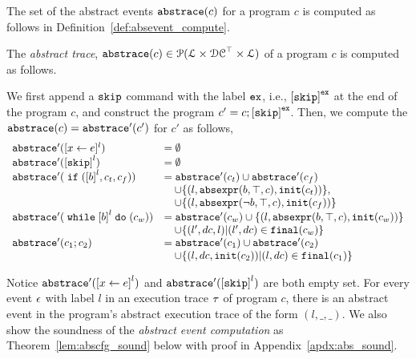 The set of the abstract events $\mathtt{abs}{\mathtt{trace}}(c)$ for a program $c$
is computed as follows in Definition~\ref{def:absevent_compute}.
 \begin{defn}
 \label{def:psRB-absevent_compute}
 The \emph{abstract trace}, $\mathtt{abs}{\mathtt{trace}}(c) \in \mathcal{P}( \mathcal{L} \times \mathcal{DC}^{\top} \times \mathcal{L} )$ of a program $c$ is computed as follows.

 We first append a $\mathtt{skip}$ command with 
the label $\mathtt{ex}$, i.e., $\clabel{\eskip}^{{\lex}}$ at the end of the program $c$, and construct 
the program $c' = c;\clabel{\eskip}^{{\lex}}$.
Then, we compute the $\mathtt{abs}{\mathtt{trace}}(c) = \mathtt{abs}{\mathtt{trace}}'(c')$ for $c'$ as follows,
 {
 \[
 \begin{array}{ll}
 \absflow'(\clabel{\assign{x}{\expr}}{}^l) & = \emptyset \\
 \absflow'(\clabel{\eskip}^{l}) & = \emptyset \\
 \absflow'(\eif (\clabel{\bexpr}^l, c_t, c_f)) & = \absflow'(c_t) \cup \absflow'(c_f)
 \\ & \quad 
 \cup \left \{(l, \absexpr(\bexpr, \top, c), \absinit(c_t) ) \right \} , 
 \\ & \quad 
 \cup \left \{ (l, \absexpr(\neg\bexpr, \top, c), \absinit(c_f)) \right \} \\
 \absflow'(\ewhile \clabel{\bexpr}^l \edo (c_w)) & = \absflow'(c_w) \cup \{(l, \absexpr(\bexpr, \top, c), \absinit(c_w)) \} 
 \\ & \quad 
 \cup \{(l', dc, l)| (l', dc) \in \absfinal(c_w) \} \\
 \absflow'(c_1 ; c_2) & = \absflow'(c_1) \cup \absflow'(c_2) 
 \\ & \quad 
 \cup \{ (l, dc, \absinit(c_2)) | (l, dc) \in \absfinal(c_1) \} \\
 \end{array}
 \]
 }
 \end{defn}
 Notice $\absflow'(\clabel{\assign{x}{\expr}}^{l})$ and $\absflow'(\clabel{\eskip}^{l})$ are both empty set. 
 For every event $\mathtt{\epsilon}$ with label $l$ in an execution trace $\mathtt{\tau}$ of program $c$, 
 there is an abstract event in the program's abstract execution trace of the form $(l, \_, \_)$. 
 We also show the soundness of the \emph{abstract event computation} as Theorem~\ref{lem:abscfg_sound} below with proof in Appendix~\ref{apdx:abs_sound}.
